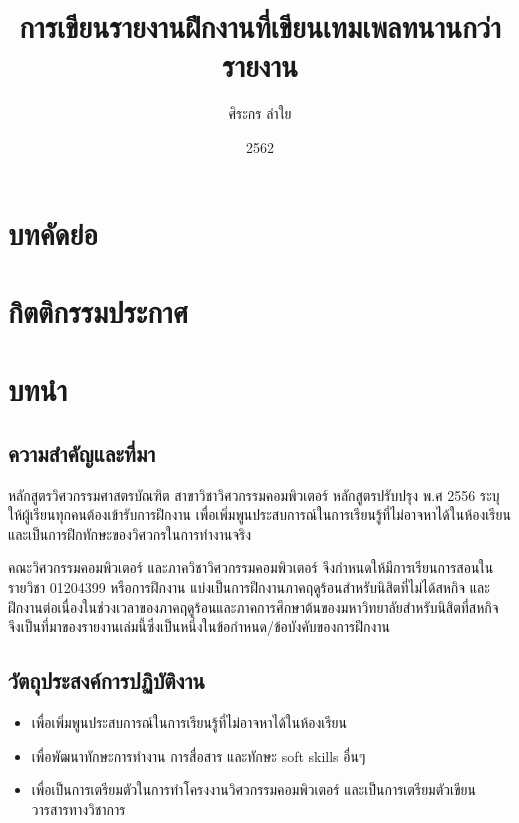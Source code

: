\documentclass[16pt,a4]{internshipreport}
\title{การเขียนรายงานฝึกงานที่เขียนเทมเพลทนานกว่ารายงาน}
\date{2562}
\author{ศิระกร ลำใย}
\begin{document}
\maketitle

\section*{บทคัดย่อ}
\lipsum[2-4]

\section*{กิตติกรรมประกาศ}
\lipsum[2-4]

\tableofcontents

\section{บทนำ}

\subsection{ความสำคัญและที่มา}
หลักสูตรวิศวกรรมศาสตรบัณฑิต สาขาวิชาวิศวกรรมคอมพิวเตอร์ หลักสูตรปรับปรุง พ.ศ 2556
ระบุให้ผู้เรียนทุกคนต้องเข้ารับการฝึกงาน เพื่อเพิ่มพูนประสบการณ์ในการเรียนรู้ที่ไม่อาจหาได้ในห้องเรียน
และเป็นการฝึกทักษะของวิศวกรในการทำงานจริง

คณะวิศวกรรมคอมพิวเตอร์ และภาควิชาวิศวกรรมคอมพิวเตอร์ จึงกำหนดให้มีการเรียนการสอนในรายวิชา
01204399 หรือการฝึกงาน แบ่งเป็นการฝึกงานภาคฤดูร้อนสำหรับนิสิตที่ไม่ได้สหกิจ
และฝึกงานต่อเนื่องในช่วงเวลาของภาคฤดูร้อนและภาคการศึกษาต้นของมหาวิทยาลัยสำหรับนิสิตที่สหกิจ
จึงเป็นที่มาของรายงานเล่มนี้ซึ่งเป็นหนึ่งในข้อกำหนด/ข้อบังคับของการฝึกงาน

\subsection{วัตถุประสงค์การปฏิบัติงาน}
\begin{itemize}
    \item เพื่อเพิ่มพูนประสบการณ์ในการเรียนรู้ที่ไม่อาจหาได้ในห้องเรียน
    \item เพื่อพัฒนาทักษะการทำงาน การสื่อสาร และทักษะ soft skills อื่นๆ
    \item เพื่อเป็นการเตรียมตัวในการทำโครงงานวิศวกรรมคอมพิวเตอร์ และเป็นการเตรียมตัวเขียนวารสารทางวิชาการ
\end{itemize}
\end{document}
